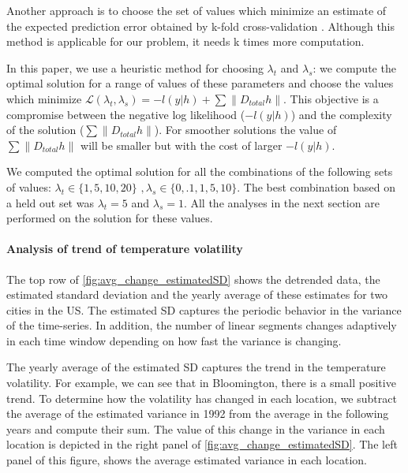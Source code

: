 \documentclass{article}
\begin{document}
Another approach is to choose the set of values which minimize an
estimate of the expected prediction error obtained by k-fold
cross-validation \citep{tibshirani_regression_1996} . Although this
method is applicable for our problem, it needs k times more
computation. 

In this paper, we use a heuristic method for choosing $\lambda_t$ and
$\lambda_s$: we compute the optimal solution for a range of values of
these parameters and choose the values which minimize
$\mathscr{L}(\lambda_t,\lambda_s)=-l(y|h)+ \sum \lVert D_{total}h
\lVert$. This objective is a compromise between the negative log
likelihood ($-l(y|h)$) and the complexity of the solution ($\sum
\lVert D_{total}h \lVert$). For smoother solutions the value of $\sum
\lVert D_{total}h \lVert$ will be smaller but with the cost of larger
$-l(y|h)$. 

We computed the optimal solution for all the combinations of the
following sets of values: $\lambda_t \in \{1,5,10,20\} \, \, ,
\lambda_s \in \{0,.1,1,5,10\}$. The best combination based on a held
out set was $\lambda_t=5$ and $\lambda_s=1$. All the analyses in the
next section are performed on the solution for these values. 


\paragraph{Analysis of trend of temperature volatility}

The top row of \autoref{fig:avg_change_estimatedSD} shows the
detrended data, the estimated standard deviation and the yearly
average of these estimates for two cities in the US. The estimated SD
captures the periodic behavior in the variance of the time-series. In
addition, the number of linear segments changes adaptively in each
time window depending on how fast the variance is changing.  

The yearly average of the estimated SD captures the trend in the
temperature volatility. For example, we can see that in Bloomington,
there is a small positive trend. To determine how the volatility has
changed in each location, we subtract the average of the estimated
variance in 1992 from the average in the following years and compute
their sum. The value of this change in the variance in each location
is depicted in the right panel of
\autoref{fig:avg_change_estimatedSD}. The left panel of this figure,
shows the average estimated variance in each location. 
\end{document}
